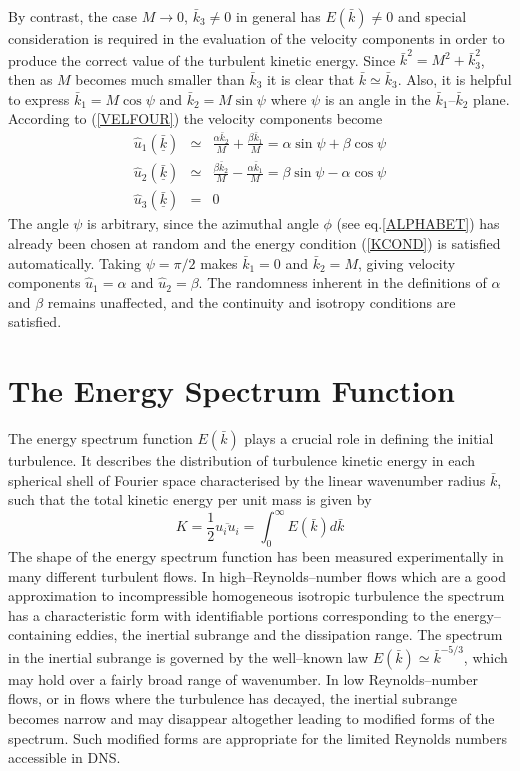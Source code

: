 \documentclass[dvips]{article}
\begin{document}
By contrast, the case $M\rightarrow 0$, $\bar{k}_{3}\neq 0$ in general has
$E(\bar{k})\neq 0$ and
special consideration is required in the evaluation of the velocity components
in order to produce the correct value of the turbulent kinetic energy.  Since
$\bar{k}^{2} = M^{2}+\bar{k}_{3}^{2}$, then as $M$ becomes much smaller
than $\bar{k}_{3}$
it is clear that $\bar{k}\simeq \bar{k}_{3}$.  Also, it is helpful to
express $\bar{k}_{1} = M\cos\psi$ and $\bar{k}_{2} = M\sin\psi$ where
$\psi$ is an angle in the $\bar{k}_{1}$--$\bar{k}_{2}$ plane.
According to (\ref{VELFOUR}) the velocity components become
\begin{eqnarray}
\hat{u}_{1}(\underline{\bar{k}}) & \simeq &
\frac{\alpha \bar{k}_{2}}{M}
+ \frac{\beta \bar{k}_{1}}{M}
= \alpha\sin\psi+\beta\cos\psi \nonumber \\
\hat{u}_{2}(\underline{\bar{k}}) & \simeq &
\frac{\beta \bar{k}_{2}}{M}
- \frac{\alpha \bar{k}_{1}}{M}
= \beta\sin\psi-\alpha\cos\psi \nonumber \\
\hat{u}_{3}(\underline{\bar{k}}) & = & 0
\end{eqnarray}
The angle $\psi$ is arbitrary, since the azimuthal angle $\phi$ (see
eq.\ref{ALPHABET}) has already been chosen at random and the energy condition
(\ref{KCOND}) is satisfied automatically.  Taking $\psi = \pi/2$ makes
$\bar{k}_{1}=0$ and $\bar{k}_{2} = M$, giving velocity components
$\hat{u}_{1}=\alpha$ and $\hat{u}_{2}=\beta$.
The randomness inherent in the definitions of $\alpha$ and $\beta$ remains
unaffected, and the continuity and isotropy conditions are satisfied.

\section{The Energy Spectrum Function}
The energy spectrum function $E(\bar{k})$ plays a crucial role in defining the
initial turbulence.  It describes the distribution of turbulence kinetic
energy in each
spherical shell of Fourier space characterised by the linear wavenumber
radius $\bar{k}$, such that the total kinetic energy per unit mass is given by
\begin{equation}
K = \frac{1}{2}\overline{u_{i}u_{i}} = \int_{0}^{\infty}
E(\bar{k})d\bar{k}
\label{EK}
\end{equation}
The shape of the energy spectrum function has been measured experimentally in
many different turbulent flows.  In high--Reynolds--number flows which
are a good approximation to incompressible
homogeneous isotropic turbulence the spectrum has a characteristic form with
identifiable portions corresponding to the energy--containing eddies, the
inertial subrange and the dissipation range.  The spectrum in the
inertial subrange is governed by the well--known law $E(\bar{k}) \simeq
\bar{k}^{-5/3}$, which may hold over a fairly broad range of wavenumber.
In low Reynolds--number flows, or in flows where the turbulence has
decayed, the inertial subrange becomes narrow
and may disappear altogether leading to modified forms of the spectrum.  Such
modified forms are appropriate for the limited Reynolds numbers
accessible in DNS. 
\end{document}
